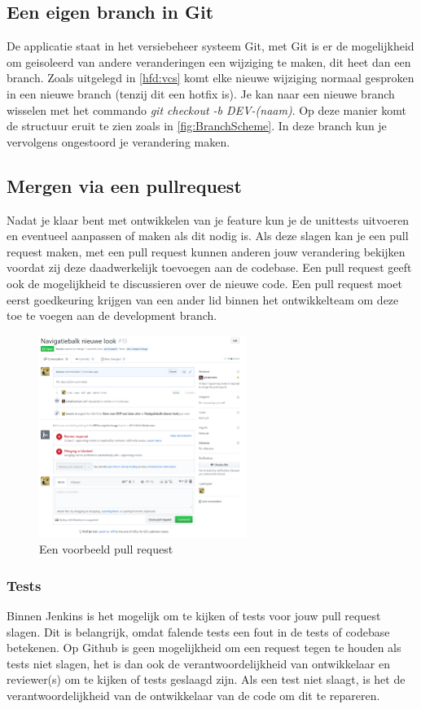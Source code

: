 \subsection{Een eigen branch in Git}
De applicatie staat in het versiebeheer systeem Git, met Git is er de mogelijkheid om geisoleerd van andere veranderingen een wijziging te maken, dit heet dan een branch. 
Zoals uitgelegd in \cref{hfd:vcs} komt elke nieuwe wijziging normaal gesproken in een nieuwe branch (tenzij dit een hotfix is).
Je kan naar een nieuwe branch wisselen met het commando \textit{git checkout -b DEV-(naam)}.
Op deze manier komt de structuur eruit te zien zoals in \cref{fig:BranchScheme}.
In deze branch kun je vervolgens ongestoord je verandering maken.

\subsection{Mergen via een pullrequest}
Nadat je klaar bent met ontwikkelen van je feature kun je de unittests uitvoeren en eventueel aanpassen of maken als dit nodig is.
Als deze slagen kan je een pull request maken, met een pull request kunnen anderen jouw verandering bekijken voordat zij deze daadwerkelijk toevoegen aan de codebase.
Een pull request geeft ook de mogelijkheid te discussieren over de nieuwe code.
Een pull request moet eerst goedkeuring krijgen van een ander lid binnen het ontwikkelteam om deze toe te voegen aan de development branch.
\begin{figure}[h]
	\centering\includegraphics[width=0.6\textwidth]{images/PullRequestExample.png}
	\caption{Een voorbeeld pull request}
\end{figure}

\subsubsection{Tests}
Binnen Jenkins is het mogelijk om te kijken of tests voor jouw pull request slagen.
Dit is belangrijk, omdat falende tests een fout in de tests of codebase betekenen.
Op Github is geen mogelijkheid om een request tegen te houden als tests niet slagen, het is dan ook de verantwoordelijkheid van ontwikkelaar en reviewer(s) om te kijken of tests geslaagd zijn.
Als een test niet slaagt, is het de verantwoordelijkheid van de ontwikkelaar van de code om dit te repareren.

